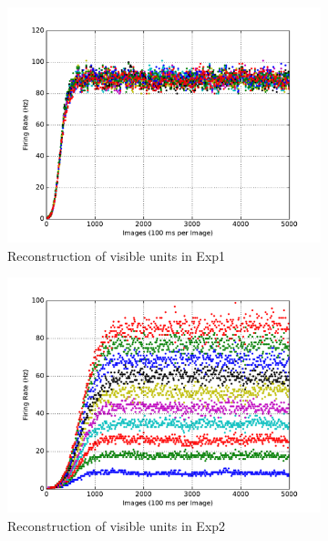 \begin{figure}
	\begin{subfigure}[t]{0.4\textwidth}
		\includegraphics[width=\textwidth]{pics_sdlm/07_exp_SAE_all_long/exp1_recon_s.pdf}
		\caption{Reconstruction of visible units in Exp1}
	\end{subfigure}
	\begin{subfigure}[t]{0.4\textwidth}
		\includegraphics[width=\textwidth]{pics_sdlm/07_exp_SAE_all_long/exp2_recon_s.pdf}
		\caption{Reconstruction of visible units in Exp2}
	\end{subfigure}\\
	\begin{subfigure}[t]{0.4\textwidth}

\end{subfigure}
\end{figure}
